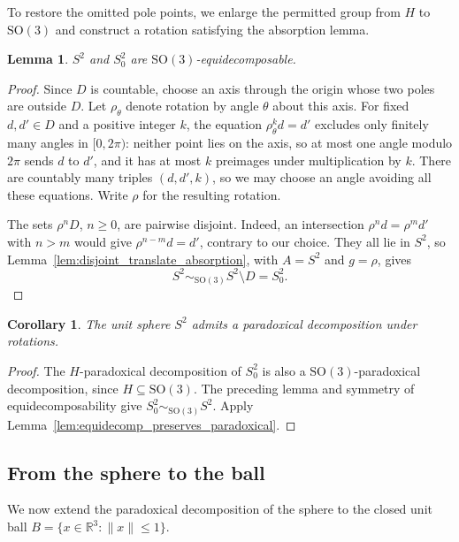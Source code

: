 \documentclass[12pt,a4paper]{article}
\theoremstyle{spaced}
\newtheorem{lemma}{Lemma}[section]
\newtheorem{corollary}{Corollary}[section]
\begin{document}
To restore the omitted pole points, we enlarge the permitted group from $H$
to $\mathrm{SO}(3)$ and construct a rotation satisfying the absorption lemma.

\begin{lemma}\label{lem:S2_equidecomp_fullsphere-updated}
	$S^2$ and $S^2_0$ are $\mathrm{SO}(3)$-equidecomposable.
\end{lemma}

\begin{proof}
	Since $D$ is countable, choose an axis through the origin whose two poles
	are outside $D$. Let $\rho_\theta$ denote rotation by angle $\theta$ about
	this axis. For fixed $d,d'\in D$ and a positive integer $k$, the equation
	$\rho_\theta^k d=d'$ excludes only finitely many angles in $[0,2\pi)$:
	neither point lies on the axis, so at most one angle modulo $2\pi$ sends
	$d$ to $d'$, and it has at most $k$ preimages under multiplication by $k$.
	There are countably many triples $(d,d',k)$, so we may choose an angle
	avoiding all these equations. Write $\rho$ for the resulting rotation.

	The sets $\rho^nD$, $n\ge0$, are pairwise disjoint. Indeed, an intersection
	$\rho^nd=\rho^md'$ with $n>m$ would give $\rho^{n-m}d=d'$, contrary to
	our choice. They all lie in $S^2$, so
	Lemma~\ref{lem:disjoint_translate_absorption}, with $A=S^2$ and $g=\rho$, gives
	\[
		S^2 \sim_{\mathrm{SO}(3)} S^2 \setminus D = S^2_0.
	\]
\end{proof}

\begin{corollary}\label{cor:S2_paradoxical-updated}
	The unit sphere $S^2$ admits a paradoxical decomposition under rotations.
\end{corollary}

\begin{proof}
	The $H$-paradoxical decomposition of $S^2_0$ is also a
	$\mathrm{SO}(3)$-paradoxical decomposition, since $H\subseteq\mathrm{SO}(3)$.
	The preceding lemma and symmetry of equidecomposability give
	$S^2_0\sim_{\mathrm{SO}(3)}S^2$.
	Apply Lemma~\ref{lem:equidecomp_preserves_paradoxical}.
\end{proof}

\subsection{From the sphere to the ball}

We now extend the paradoxical decomposition of the sphere to the closed unit ball
\(
B = \{x \in \mathbb{R}^3 : \|x\|\le 1\}.
\)
\end{document}
